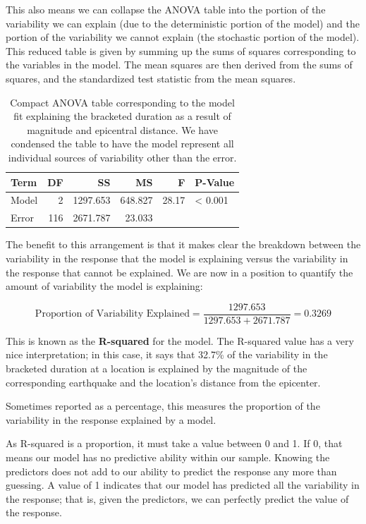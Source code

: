 \documentclass[]{book}
\theoremstyle{definition}
\theoremstyle{definition}
\theoremstyle{definition}
\theoremstyle{remark}
\let\BeginKnitrBlock\begin \let\EndKnitrBlock\end
\begin{document}
This also means we can collapse the ANOVA table into the portion of the
variability we can explain (due to the deterministic portion of the
model) and the portion of the variability we cannot explain (the
stochastic portion of the model). This reduced table is given by summing
up the sums of squares corresponding to the variables in the model. The
mean squares are then derived from the sums of squares, and the
standardized test statistic from the mean squares.

\begin{table}

\caption{\label{tab:regquality-overall-anova}Compact ANOVA table corresponding to the model fit explaining the bracketed duration as a result of magnitude and epicentral distance.  We have condensed the table to have the model represent all individual sources of variability other than the error.}
\centering
\begin{tabular}[t]{l|r|r|r|r|l}
\hline
Term & DF & SS & MS & F & P-Value\\
\hline
Model & 2 & 1297.653 & 648.827 & 28.17 & < 0.001\\
\hline
Error & 116 & 2671.787 & 23.033 &  & \\
\hline
\end{tabular}
\end{table}

The benefit to this arrangement is that it makes clear the breakdown
between the variability in the response that the model is explaining
versus the variability in the response that cannot be explained. We are
now in a position to quantify the amount of variability the model is
explaining:

\[\text{Proportion of Variability Explained} = \frac{1297.653}{1297.653+2671.787} = 0.3269\]

This is known as the \textbf{R-squared} for the model. The R-squared
value has a very nice interpretation; in this case, it says that 32.7\%
of the variability in the bracketed duration at a location is explained
by the magnitude of the corresponding earthquake and the location's
distance from the epicenter.

\BeginKnitrBlock{definition}[R Squared]
\protect\hypertarget{def:defn-r-squared}{}{\label{def:defn-r-squared}
{} }Sometimes reported as a percentage, this
measures the proportion of the variability in the response explained by
a model.
\EndKnitrBlock{definition}

As R-squared is a proportion, it must take a value between 0 and 1. If
0, that means our model has no predictive ability within our sample.
Knowing the predictors does not add to our ability to predict the
response any more than guessing. A value of 1 indicates that our model
has predicted all the variability in the response; that is, given the
predictors, we can perfectly predict the value of the response.
\end{document}

